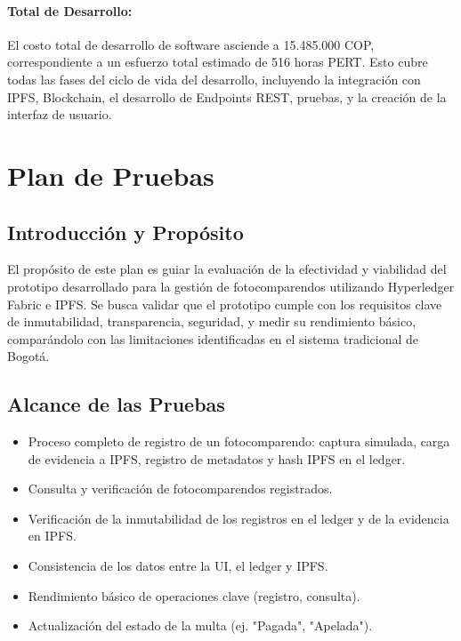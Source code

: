 \documentclass[
    letterpaper, 
    man,   
    spanish,
    12pt,
    donotrepeattitle,
    floatsintext,
    hidelinks %
]{apa7}
\begin{document}
\paragraph{Total de Desarrollo:} El costo total de desarrollo de software asciende a 15.485.000 COP, correspondiente a un esfuerzo total estimado de 516 horas PERT. Esto cubre todas las fases del ciclo de vida del desarrollo, incluyendo la integración con IPFS, Blockchain, el desarrollo de Endpoints REST, pruebas, y la creación de la interfaz de usuario. 

\section{Plan de Pruebas}

\subsection{Introducción y Propósito}
El propósito de este plan es guiar la evaluación de la efectividad y viabilidad del prototipo desarrollado para la gestión de fotocomparendos utilizando Hyperledger Fabric e IPFS. Se busca validar que el prototipo cumple con los requisitos clave de inmutabilidad, transparencia, seguridad, y medir su rendimiento básico, comparándolo con las limitaciones identificadas en el sistema tradicional de Bogotá.

\subsection{Alcance de las Pruebas}
\begin{itemize}
    \item Proceso completo de registro de un fotocomparendo: captura simulada, carga de evidencia a IPFS, registro de metadatos y hash IPFS en el ledger.
    \item Consulta y verificación de fotocomparendos registrados.
    \item Verificación de la inmutabilidad de los registros en el ledger y de la evidencia en IPFS.
    \item Consistencia de los datos entre la UI, el ledger y IPFS.
    \item Rendimiento básico de operaciones clave (registro, consulta).
    \item Actualización del estado de la multa (ej. "Pagada", "Apelada").
\end{itemize}
\end{document}
